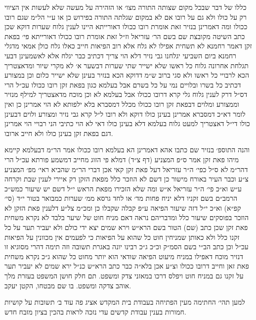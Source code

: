 \documentclass[12pt, openany]{book}
\begin{document}
\begin{multicols}{2}
כללו של דבר שבכל מקום שצותה התורה מצו׳ או הזהירה על מעשה שלא לעשות אין הציווי רק על כולו ולא גם על רובו אם לא במקום שגלתה התורה בפירוש כן או ע״י הל״מ שגם רובו ככולו ומה דאמרינן בנזיר זאת אומרת רובו ככולו דאורייתא היינו לענין גלוח שערות דוקא שכן כתב השיטה מקובצת שם בשם הר׳ עזריאל וז״ל זאת אומרת רובו ככולו דאורייתא פי׳ בפאת זקן דאמר רחמנא לא תשחית אפילו לא גלח אלא רוב הפיאות חייב כאלו גלח כולן אמאי מדגלי רחמנא ביום השביעי יגלחנו גבי נזיר דלא הוי צריך דכתיב כבר יגלח אלא לאשמעינן דבעי תגלחת אחרונה גלוח כל ראשו שלא ישייר שתי שערות דבשער א׳ לא מקרי שיור ומדאצטריך הכא לרבויי כל ראשו ולא סגי ברוב ש״מ דדוקא הכא בנזיר בעינן שלא ישייר כלום וכן במצורע דכתיב כל בשרו ובלויים נמי על כל בשרם אבל בעלמא כגון בפאת זקן רובו ככולו עכ״ל הרי דס״ל דרק לענין גלוח גלי קרא דרובו ככולו אבל בעלמא לא וכן מוכח מדאצטריך למילף מנזיר וממצורע ומלוים דבפאת זקן רובו ככולו מכלל דמסברא בלא ילפותא לא הוי אמרינן כן ואין לומר דא״כ דמסברא אמרינן בעינן כולו דוקא ולא רובו ל״ל קרא גבי נזיר ומצורע ולוים דבעינן כולו די״ל דאצטריך למעט גלוח בעלמא דלא בעינן כולו דאי לא הוי כתיבי הני רבויי הוי אמרינן דגם בפאת זקן בעינן כולו ולא חייב ארובו.\\\vspace{0pt}

והנה התוספ׳ בנזיר שם כתבו אהא דאמרינן הא בעלמא רובו ככולו אמר הר״מ דבעלמא קיימא מיהו פאת זקן אמר ס״פ המצניע (דף צ״ד) דמלא פי הזוג מחייב דמשמע פורתא עכ״ל הרי דהר״מ לא ס״ל כפי׳ ה״ר עזריאל דעל פאת זקן קאי אכן דברי הר״מ שהביא ראי׳ מפ׳ המצניע צ״ע וכבר העיר באורח מישור כן דשם לא הוזכר כלל מפאת הזקן רק איירי לענין שבת וקרחה ע״ש וא״כ פי׳ ה״ר עזריאל א״ש ומה שלא הזכירו מפאת הראש י״ל דשם יש שיעור כמש״כ הרמב״ם בשם זקניו דלא יניח פחות מד׳ או לחד גרסא ממ׳ שערות כמבואר בטור י״ד (סי׳ קפ״א) וא״כ י״ל דזה שיעור הפיאה ע״פ קבלה שקבלו כן ומכ״מ צל״ע דלענין פאת הזקן לא הוזכר בפוסקים שיעור כלל ומדבריהם נראה דאם מניח חוט של שיער בלבד לא נקרא משחית פאת זקן שכן כתב (שם) הטור בשם הרא״ש וירא שמים יצא ידי כולם ולא יעביר תער על כל זקנו כלל ולא כאותן שמניחין חוט כל שהוא על הפיאות כי לפעמים אין מכוונין על הפיאות עכ״ל וכן כתב הב״י בשם הסמ״ק וכ״כ ג״כ רבינו יונה באגרת תשובה וזה תימה דהרי מסוגיא זו דנזיר מוכח דאפילו במניח מיעוט הפיאה שודאי הוא יותר מחוט כל שהוא ג״כ נקרא משחית פאת זאן וחייב דרובו ככולו וצ״ע אכן בלא״ה כבר כתב הרא״ש כנ״ל ירא שמים לא יעביר תער על זקנו גם במניח חוט ויפלס דרכו במאזני צדק ומשפט. תם חלק חושן המשפט בעזרת מלך אוהב צדקה ומשפט. בו שם מבטחו, הקטן יעקב.\\\vspace{0pt}

למען תהי׳ החתימה מעין הפתיחה בעבודת בית המקדש אציג פה עוד ב׳ תשובות על קושיות חמורות בענין עבודת קדשים עדי נזכה לראות בהכין בציון מזבח חדש.\\\vspace{0pt}

\end{multicols}\newpage
\end{document}
